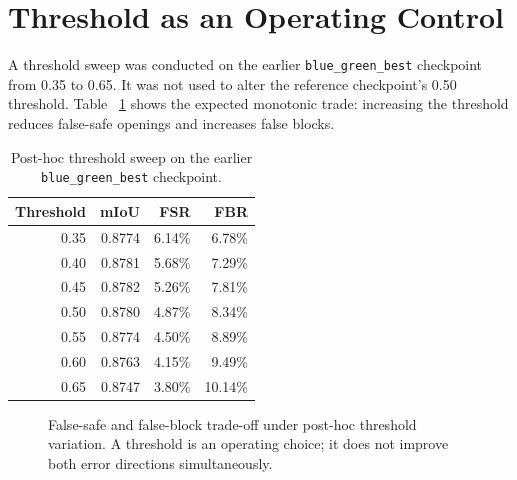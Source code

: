 \section{Threshold as an Operating Control}

A threshold sweep was conducted on the earlier
\texttt{blue\_green\_best} checkpoint from 0.35 to 0.65. It was not used to
alter the reference checkpoint's 0.50 threshold. Table
~\ref{tab:pidnet_threshold_sweep} shows the expected monotonic trade:
increasing the threshold reduces false-safe openings and increases false
blocks.

\begin{table}[H]
\centering
\caption{Post-hoc threshold sweep on the earlier
\texttt{blue\_green\_best} checkpoint.}
\label{tab:pidnet_threshold_sweep}
\begin{tabular}{@{}rrrr@{}}
\toprule
\textbf{Threshold} & \textbf{mIoU} & \textbf{FSR} & \textbf{FBR} \\
\midrule
0.35 & 0.8774 & 6.14\% & 6.78\% \\
0.40 & 0.8781 & 5.68\% & 7.29\% \\
0.45 & 0.8782 & 5.26\% & 7.81\% \\
0.50 & 0.8780 & 4.87\% & 8.34\% \\
0.55 & 0.8774 & 4.50\% & 8.89\% \\
0.60 & 0.8763 & 4.15\% & 9.49\% \\
0.65 & 0.8747 & 3.80\% & 10.14\% \\
\bottomrule
\end{tabular}
\end{table}

\begin{figure}[H]
\centering
{}
\caption{False-safe and false-block trade-off under post-hoc threshold
variation. A threshold is an operating choice; it does not improve both error
directions simultaneously.}
\label{fig:pidnet_threshold_plot}
\end{figure}

